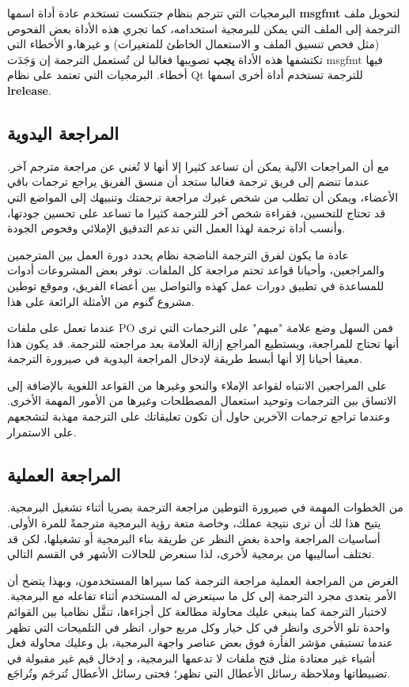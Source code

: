 البرمجيات التي تترجم بنظام جتتكست تستخدم عادة أداة اسمها {\bf msgfmt}
لتحويل ملف الترجمة إلى الملف التي يمكن للبرمجية استخدامه، كما تجري هذه
الأداة بعض الفحوص (مثل فحص تنسيق الملف و الاستعمال الخاطئ للمتغيرات) و
غيرها،و الأخطاء التي تكتشفها هذه الأداة {\bf يجب} تصويبها فغالبا لن
تُستعمل الترجمة إن وَجَدَت msgfmt فيها أخطاء. البرمجيات التي تعتمد على
نظام Qt للترجمة تستخدم أداة أخرى اسمها {\bf lrelease}.

\subsection[ref:37415529]{المراجعة اليدوية}
مع أن المراجعات الآلية يمكن أن
تساعد كثيرا إلا أنها لا تُغني عن مراجعة مترجم آخر. عندما تنضم إلى فريق
ترجمة فغالبا ستجد أن منسق الفريق يراجع ترجمات باقي الأعضاء، ويمكن أن
تطلب من شخص غيرك مراجعة ترجمتك وتنبيهك إلى المواضع التي قد تحتاج
للتحسين، فقراءة شخص آخر للترجمة كثيرا ما تساعد على تحسين جودتها، وأنسب
أداة ترجمة لهذا العمل التي تدعم التدقيق الإملائي وفحوص الجودة.

عادة ما يكون لفرق الترجمة الناضجة نظام يحدد دورة العمل بين المترجمين
والمراجعين، وأحيانا قواعد تحتم مراجعة كل الملفات. توفر بعض المشروعات
أدوات للمساعدة في تطبيق دورات عمل كهذه والتواصل بين أعضاء الفريق، وموقع
توطين مشروع گنوم من الأمثلة الرائعة على هذا.

عندما تعمل على ملفات PO فمن السهل وضع علامة "مبهم" على الترجمات التي ترى
أنها تحتاج للمراجعة، ويستطيع المراجع إزالة العلامة بعد مراجعته للترجمة.
قد يكون هذا معيقا أحيانا إلا أنها أبسط طريقة لإدخال المراجعة اليدوية في
صيرورة الترجمة.

على المراجعين الانتباه لقواعد الإملاء والنحو وغيرها من القواعد اللغوية
بالإضافة إلى الاتساق بين الترجمات وتوحيد استعمال المصطلحات وغيرها من
الأمور المهمة الأخرى. وعندما تراجع ترجمات الآخرين حاول أن تكون تعليقاتك
على الترجمة مهذبة لتشجعهم على الاستمرار.

\subsection[ref:34365426]{المراجعة العملية}
من الخطوات المهمة في صيرورة
التوطين مراجعة الترجمة بصريا أثناء تشغيل البرمجية. يتيح هذا لك أن ترى
نتيجة عملك، وخاصة متعة رؤية البرمجية مترجمةً للمرة الأولى. أساسيات
المراجعة واحدة بغض النظر عن طريقة بناء البرمجية أو تشغيلها، لكن قد
تختلف أساليبها من برمجية لأخرى، لذا سنعرض للحالات الأشهر في القسم
التالي.

الغرض من المراجعة العملية مراجعة الترجمة كما سيراها المستخدمون، وبهذا
يتضح أن الأمر يتعدى مجرد الترجمة إلى كل ما سيتعرض له المستخدم أثناء
تفاعله مع البرمجية. لاختبار الترجمة كما ينبغي عليك محاولة مطالعة كل
أجزاءها، تنقَّل نظاميا بين القوائم واحدة تلو الأخرى وانظر في كل خيار
وكل مربع حوار، انظر في التلميحات التي تظهر عندما تستبقي مؤشر الفأرة فوق
بعض عناصر واجهة البرمجية، بل وعليك محاولة فعل أشياء غير معتادة مثل فتح
ملفات لا تدعمها البرمجية، و إدخال قيم غير مقبولة في تضبيطاتها وملاحظة
رسائل الأعطال التي تظهر؛ فحتى رسائل الأعطال تُترجَم وتُراجَع.

